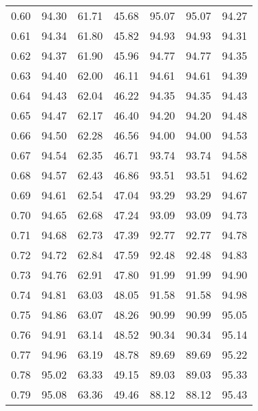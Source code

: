 \begin{tabular}{|c|c|c|c|c|c|c|}
      0.60 &     94.30 &     61.71 &      45.68 &   95.07 &      95.07 &         94.27 \\
      0.61 &     94.34 &     61.80 &      45.82 &   94.93 &      94.93 &         94.31 \\
      0.62 &     94.37 &     61.90 &      45.96 &   94.77 &      94.77 &         94.35 \\
      0.63 &     94.40 &     62.00 &      46.11 &   94.61 &      94.61 &         94.39 \\
      0.64 &     94.43 &     62.04 &      46.22 &   94.35 &      94.35 &         94.43 \\
      0.65 &     94.47 &     62.17 &      46.40 &   94.20 &      94.20 &         94.48 \\
      0.66 &     94.50 &     62.28 &      46.56 &   94.00 &      94.00 &         94.53 \\
      0.67 &     94.54 &     62.35 &      46.71 &   93.74 &      93.74 &         94.58 \\
      0.68 &     94.57 &     62.43 &      46.86 &   93.51 &      93.51 &         94.62 \\
      0.69 &     94.61 &     62.54 &      47.04 &   93.29 &      93.29 &         94.67 \\
      0.70 &     94.65 &     62.68 &      47.24 &   93.09 &      93.09 &         94.73 \\
      0.71 &     94.68 &     62.73 &      47.39 &   92.77 &      92.77 &         94.78 \\
      0.72 &     94.72 &     62.84 &      47.59 &   92.48 &      92.48 &         94.83 \\
      0.73 &     94.76 &     62.91 &      47.80 &   91.99 &      91.99 &         94.90 \\
      0.74 &     94.81 &     63.03 &      48.05 &   91.58 &      91.58 &         94.98 \\
      0.75 &     94.86 &     63.07 &      48.26 &   90.99 &      90.99 &         95.05 \\
      0.76 &     94.91 &     63.14 &      48.52 &   90.34 &      90.34 &         95.14 \\
      0.77 &     94.96 &     63.19 &      48.78 &   89.69 &      89.69 &         95.22 \\
      0.78 &     95.02 &     63.33 &      49.15 &   89.03 &      89.03 &         95.33 \\
      0.79 &     95.08 &     63.36 &      49.46 &   88.12 &      88.12 &         95.43 \\

\end{tabular}
